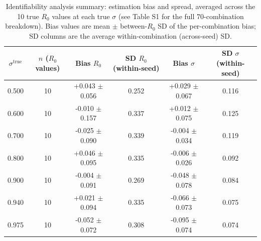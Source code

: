 \begin{table}[h]
\centering
\caption{Identifiability analysis summary: estimation bias and spread, averaged across the 10 true $R_0$ values at each true $\sigma$ (see Table S1 for the full 70-combination breakdown). Bias values are mean $\pm$ between-$R_0$ SD of the per-combination bias; SD columns are the average within-combination (across-seed) SD.}
\label{tab:identifiability_compact}
\begin{tabular}{cccccc}
\hline
$\sigma^{\text{true}}$ & $n$ ($R_0$ values) & Bias $R_0$ & SD $R_0$ (within-seed) & Bias $\sigma$ & SD $\sigma$ (within-seed) \\
\hline
0.500 & 10 & +0.043 $\pm$ 0.056 & 0.252 & +0.029 $\pm$ 0.067 & 0.116 \\
0.600 & 10 & -0.010 $\pm$ 0.157 & 0.337 & +0.012 $\pm$ 0.075 & 0.125 \\
0.700 & 10 & -0.025 $\pm$ 0.090 & 0.339 & -0.004 $\pm$ 0.034 & 0.119 \\
0.800 & 10 & +0.046 $\pm$ 0.095 & 0.335 & -0.006 $\pm$ 0.026 & 0.092 \\
0.900 & 10 & -0.004 $\pm$ 0.091 & 0.269 & -0.048 $\pm$ 0.078 & 0.084 \\
0.940 & 10 & +0.021 $\pm$ 0.094 & 0.335 & -0.066 $\pm$ 0.073 & 0.075 \\
0.975 & 10 & -0.052 $\pm$ 0.072 & 0.308 & -0.095 $\pm$ 0.074 & 0.074 \\
\hline
\end{tabular}
\end{table}